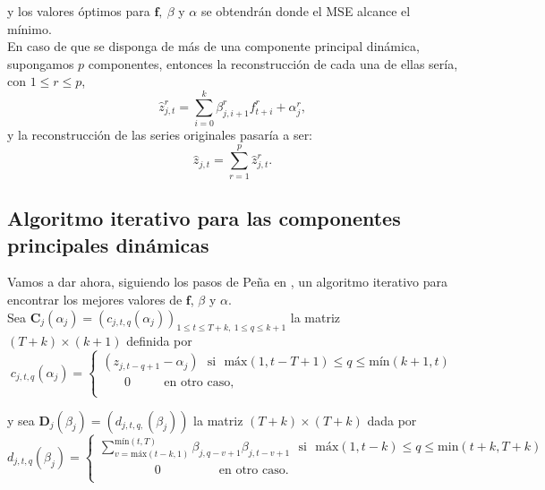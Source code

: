y los valores óptimos para $\mathbf{f},\ \beta$ y $\alpha$ se obtendrán donde el MSE alcance el mínimo.\\

En caso de que se disponga de más de una componente principal dinámica, supongamos $p$ componentes, entonces la reconstrucción de cada una de ellas sería, con $1 \leq r \leq p$,
\[	\widehat{z}_{j,t}^r = \sum_{i=0}^k \beta_{j,i+1}^rf_{t+i}^r + \alpha_j^r,	\]
y la reconstrucción de las series originales pasaría a ser:
\[	\widehat{z}_{j,t} = \sum_{r=1}^p \widehat{z}_{j,t}^r.	\]


\subsection{Algoritmo iterativo para las componentes principales dinámicas}

Vamos a dar ahora, siguiendo los pasos de Peña en \cite{pena16}, un algoritmo iterativo para encontrar los mejores valores de $\mathbf{f}$, $\beta$ y $\alpha$.\\


Sea $\mathbf{C}_j(\alpha_j) = (c_{j,t,q}(\alpha_j))_{1 \leq t \leq T+k,\ 1 \leq q \leq k+1}$ la matriz $(T+k)\times (k+1)$ definida por 
\begin{equation*}
  c_{j,t,q}(\alpha_j) = 
  \left\lbrace
  \begin{array}{l}
     (z_{j,t-q+1} - \alpha_j)\ \ \ \text{si} \ \ \ \text{máx}(1, t-T+1) \leq q \leq \text{mín}(k+1,t) \\
     \ \ \ \ \ \ \ \ 0 \ \ \ \ \ \ \ \ \ \ \ \ \text{en otro caso}, \\
  \end{array}
  \right.
\end{equation*}

y sea $\mathbf{D}_j(\beta_j) = (d_{j,t,q,}(\beta_j))$ la matriz $(T+k) \times (T+k)$ dada por
\begin{equation*}
  d_{j,t,q}(\beta_j) = 
  \left\lbrace
  \begin{array}{l}
     \sum_{v=\text{máx}(t-k,1)}^{\text{mín}(t,T)} \beta_{j,q-v+1} \beta_{j,t-v+1} \ \ \ \text{si} \ \ \ \text{máx}(1, t-k) \leq q \leq \text{min}(t+k,T+k) \\
     \ \ \ \ \ \ \ \ \ \ \ \ \ \ \ \ \ \ \ \ 0 \ \ \ \ \ \ \ \ \ \ \ \ \ \ \ \ \ \ \ \ \ \text{en otro caso}. \\
  \end{array}
  \right.
\end{equation*}

